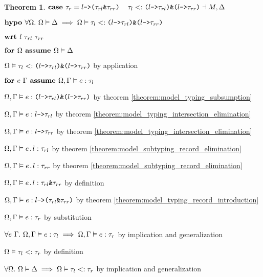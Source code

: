\documentclass[acmsmall]{acmart}
\theoremstyle{definition}
\newtheorem{theorem}{Theorem}[section]
\begin{document}
\begin{theorem}
    \item \Z $\textbf{case } 
      \tau_r = \texttt{$l$->($\tau_{rl}$\&$\tau_{rr}$)}
      \hspace{4mm}
      \tau_l
      <:
      \texttt{($l$->$\tau_{rl}$)\&($l$->$\tau_{rr}$)}
      \dashv M, \Delta
    $
    \item \Z $\B{hypo }
      \forall \Omega .\ 
      \Omega \satisfies \Delta
      \implies
      \Omega \satisfies \tau_l \subtypes \code{($l$->$\tau_{rl}$)\&($l$->$\tau_{rr}$)}
    $ 
    \item \Z $\B{wrt } l\ \tau_{rl}\ \tau_{rr}$ 
      \item \Z\Z $\textbf{for } \Omega \textbf{ assume } \Omega \vDash \Delta$
        \item \Z\Z\Z $\Omega \vDash \tau_l <: \texttt{($l$->$\tau_{rl}$)\&($l$->$\tau_{rr}$)}$
        by application
        \item \Z\Z\Z $\textbf{for } e\ \Gamma \textbf{ assume } \Omega, \Gamma \vDash e : \tau_l$ 
          \item \Z\Z\Z\Z $\Omega, \Gamma \vDash e : \texttt{($l$->$\tau_{rl}$)\&($l$->$\tau_{rr}$)}$
          by theorem \ref{theorem:model_typing_subsumption} 
          \item \Z\Z\Z\Z $\Omega, \Gamma \vDash e : \texttt{$l$->$\tau_{rl}$}$ by theorem \ref{theorem:model_typing_intersection_elimination}
          \item \Z\Z\Z\Z $\Omega, \Gamma \vDash e : \texttt{$l$->$\tau_{rr}$}$ by theorem \ref{theorem:model_typing_intersection_elimination}
          \item \Z\Z\Z\Z $\Omega, \Gamma \vDash \texttt{$e$.$l$} : \tau_{rl}$ by theorem \ref{theorem:model_subtyping_record_elimination}
          \item \Z\Z\Z\Z $\Omega, \Gamma \vDash \texttt{$e$.$l$} : \tau_{rr}$ by theorem \ref{theorem:model_subtyping_record_elimination}
          \item \Z\Z\Z\Z $\Omega, \Gamma \vDash \texttt{$e$.$l$} : \texttt{$\tau_{rl}$\&$\tau_{rr}$}$ by definition
          \item \Z\Z\Z\Z $\Omega, \Gamma \vDash e : \texttt{$l$->($\tau_{rl}$\&$\tau_{rr}$)}$ by theorem \ref{theorem:model_typing_record_introduction} 
          \item \Z\Z\Z\Z $\Omega, \Gamma \vDash e : \tau_r$ by substitution 
        \item \Z\Z\Z $\forall e\ \Gamma .\ \Omega, \Gamma \vDash e : \tau_l \implies 
          \Omega, \Gamma \vDash e : \tau_r
        $ by implication and generalization
        \item \Z\Z\Z $\Omega \vDash \tau_l <: \tau_r$
        by definition 
      \item \Z\Z $\forall \Omega .\ \Omega \vDash \Delta \implies \Omega \vDash \tau_l <: \tau_r$ 
      by implication and generalization 



\end{theorem}
\end{document}
